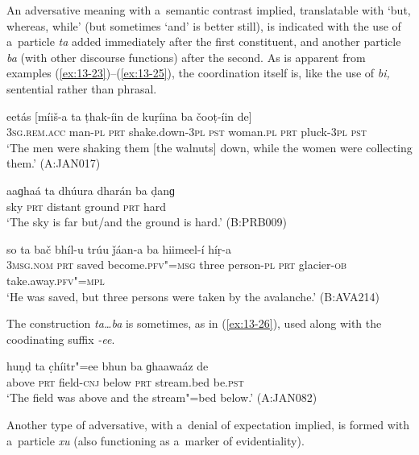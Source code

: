 An adversative meaning with a~semantic contrast implied, translatable with `but, whereas, while' (but sometimes `and' is better still), is indicated with the use of a~particle \textit{ta} added immediately after the first constituent, and another particle \textit{ba} (with other discourse functions) after the second. As is apparent from examples (\ref{ex:13-23})--(\ref{ex:13-25}), the coordination itself is, like the use of \textit{bi,} sentential rather than phrasal.

\begin{exe}
\ex
\label{ex:13-23}
\gll eetás [míiš-a ta ṭhak-íin de kuṛíina ba čooṭ-íin de] \\
\textsc{3sg.rem.acc} man-\textsc{pl} \textsc{prt} shake.down-\textsc{3pl} \textsc{pst} woman.\textsc{pl} \textsc{prt} pluck-\textsc{3pl} \textsc{pst} \\
\glt `The men were shaking them [the walnuts] down, while the women were collecting them.' (A:JAN017)

\ex
\label{ex:13-24}
\gll aaɡhaá ta dhúura dharán ba ḍanɡ  \\
sky \textsc{prt} distant ground \textsc{prt} hard \\
\glt `The sky is far but/and the ground is hard.' (B:PRB009)

\ex
\label{ex:13-25}
\gll so ta bač bhíl-u trúu ǰáan-a ba hiimeel-í híṛ-a \\
\textsc{3msg.nom} \textsc{prt} saved become.\textsc{pfv"=msg} three person-\textsc{pl} \textsc{prt } glacier-\textsc{ob} take.away.\textsc{pfv"=mpl}  \\
\glt `He was saved, but three persons were taken by the avalanche.' (B:AVA214) 
\end{exe}

The construction \textit{ta{\ldots}ba} is sometimes, as in (\ref{ex:13-26}), used along with the coodinating suffix \textit{-ee}.

\begin{exe}
\ex
\label{ex:13-26}
\gll huṇḍ ta c̣híitr"=ee bhun ba ɡhaawaáz de \\
above \textsc{prt} field-\textsc{cnj} below \textsc{prt} stream.bed be.\textsc{pst} \\
\glt `The field was above and the stream"=bed below.' (A:JAN082) 
\end{exe}


 Another type of adversative, with a~denial of expectation implied, is formed with a~particle \textit{xu} (also functioning as a~marker of evidentiality).


